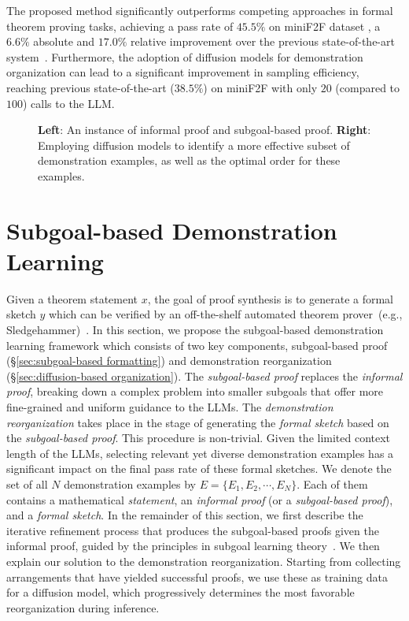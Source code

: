 \documentclass{article}
\begin{document}
The proposed method significantly outperforms competing approaches in formal theorem proving tasks, achieving a pass rate of $45.5\%$ on miniF2F dataset \cite{zheng2021minif2f}, a $6.6\%$ absolute and $17.0\%$ relative improvement over the previous state-of-the-art system~\cite{jiang2022draft}. Furthermore, the adoption of diffusion models for demonstration organization can lead to a significant improvement in sampling efficiency, reaching previous state-of-the-art ($38.5\%$) on miniF2F with only $20$ (compared to $100$) calls to the LLM.


\begin{figure*}
\centering
{}
\vspace{-2mm}
\caption{\textbf{Left}: An instance of informal proof and subgoal-based proof. \textbf{Right}: Employing diffusion models to identify a more effective subset of demonstration examples, as well as the optimal order for these examples.}
\end{figure*}



\section{Subgoal-based Demonstration Learning}
\label{sec:method}
Given a theorem statement $x$, the goal of proof synthesis is to generate a formal sketch $y$ which can be verified by an off-the-shelf automated theorem prover~(e.g., Sledgehammer)~\cite{jiang2022draft}. In this section, we propose the subgoal-based demonstration learning framework which consists of two key components, subgoal-based proof (\S\ref{sec:subgoal-based formatting}) and demonstration reorganization (\S\ref{sec:diffusion-based organization}). The \emph{subgoal-based proof} replaces the \emph{informal proof}, breaking down a complex problem into smaller subgoals that offer more fine-grained and uniform guidance to the LLMs. The \emph{demonstration reorganization} takes place in the stage of generating the \emph{formal sketch} based on the \emph{subgoal-based proof}. This procedure is non-trivial. Given the limited context length of the LLMs, selecting relevant yet diverse demonstration examples has a significant impact on the final pass rate of these formal sketches. 
We denote the set of all $N$ demonstration examples by $E=\{E_1, E_2, \cdots, E_N\}$. Each of them contains a mathematical \emph{statement}, an \emph{informal proof} (or a \emph{subgoal-based proof}), and a \emph{formal sketch}. In the remainder of this section, we first describe the iterative refinement process that produces the subgoal-based proofs given the informal proof, guided by the principles in subgoal learning theory~\cite{zhang2021c}. We then explain our solution to the demonstration reorganization. Starting from collecting arrangements that have yielded successful proofs, we use these as training data for a diffusion model, which progressively determines the most favorable reorganization during inference.
\end{document}

